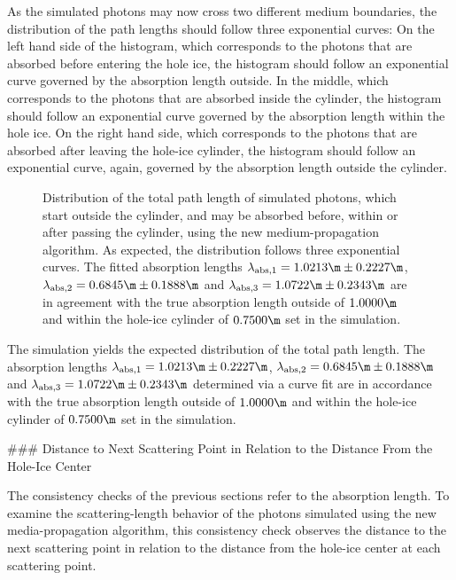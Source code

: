 As the simulated photons may now cross two different medium boundaries, the distribution of the path lengths should follow three exponential curves: On the left hand side of the histogram, which corresponds to the photons that are absorbed before entering the hole ice, the histogram should follow an exponential curve governed by the absorption length outside. In the middle, which corresponds to the photons that are absorbed inside the cylinder, the histogram should follow an exponential curve governed by the absorption length within the hole ice. On the right hand side, which corresponds to the photons that are absorbed after leaving the hole-ice cylinder, the histogram should follow an exponential curve, again, governed by the absorption length outside the cylinder.

\begin{figure}
  \caption{Distribution of the total path length of simulated photons, which start outside the cylinder, and may be absorbed before, within or after passing the cylinder, using the new medium-propagation algorithm. As expected, the distribution follows three exponential curves. The fitted absorption lengths $\lambda_\text{abs,1} = 1.0213\m \pm 0.2227\m$, $\lambda_\text{abs,2} = 0.6845\m \pm 0.1888\m$ and $\lambda_\text{abs,3} = 1.0722\m \pm 0.2343\m$ are in agreement with the true absorption length outside of $1.0000\m$ and within the hole-ice cylinder of $0.7500\m$ set in the simulation.}
\end{figure}

The simulation yields the expected distribution of the total path length. The absorption lengths $\lambda_\text{abs,1} = 1.0213\m \pm 0.2227\m$, $\lambda_\text{abs,2} = 0.6845\m \pm 0.1888\m$ and $\lambda_\text{abs,3} = 1.0722\m \pm 0.2343\m$ determined via a curve fit are in accordance with the true absorption length outside of $1.0000\m$ and within the hole-ice cylinder of $0.7500\m$ set in the simulation.


### Distance to Next Scattering Point in Relation to the Distance From the Hole-Ice Center
\label{sec:cross_check_71}


The consistency checks of the previous sections refer to the absorption length. To examine the scattering-length behavior of the photons simulated using the new media-propagation algorithm, this consistency check observes the distance to the next scattering point in relation to the distance from the hole-ice center at each scattering point.

